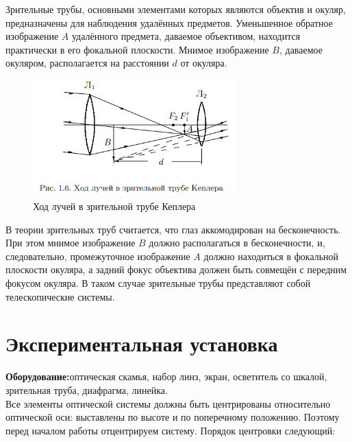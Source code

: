 Зрительные трубы, основными элементами которых являются объектив и окуляр, предназначены для наблюдения удалённых предметов. Уменьшенное обратное изображение $A$ удалённого предмета, даваемое объективом, находится практически в его фокальной плоскости. Мнимое изображение $B$, даваемое окуляром, располагается на расстоянии $d$ от окуляра.

\begin{figure}[h]
\centering
\includegraphics[width=0.7\textwidth]{images/telescope_scheme.png}
\caption{Ход лучей в зрительной трубе Кеплера}
\label{fig:telescope}
\end{figure}

В теории зрительных труб считается, что глаз аккомодирован на бесконечность. При этом мнимое изображение $B$ должно располагаться в бесконечности, и, следовательно, промежуточное изображение $A$ должно находиться в фокальной плоскости окуляра, а задний фокус объектива должен быть совмещён с передним фокусом окуляра. В таком случае зрительные трубы представляют собой телескопические системы.

\section*{Экспериментальная установка}
\textbf{Оборудование:}оптическая скамья, набор линз, экран, осветитель со шкалой, зрительная труба, диафрагма, линейка.\\

\indent Все элементы оптической системы должны быть центрированы относительно оптической оси: выставлены по высоте и по поперечному положению. Поэтому перед началом работы отцентрируем систему. Порядок центровки следующий:\\

